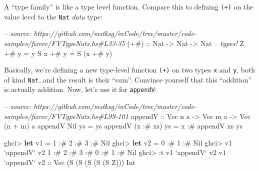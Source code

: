\documentclass[]{article}
\newenvironment{Shaded}{}{}
\newcommand{\KeywordTok}[1]{\textcolor[rgb]{0.00,0.44,0.13}{\textbf{#1}}}
\newcommand{\DataTypeTok}[1]{\textcolor[rgb]{0.56,0.13,0.00}{#1}}
\newcommand{\DecValTok}[1]{\textcolor[rgb]{0.25,0.63,0.44}{#1}}
\newcommand{\CommentTok}[1]{\textcolor[rgb]{0.38,0.63,0.69}{\textit{#1}}}
\newcommand{\OtherTok}[1]{\textcolor[rgb]{0.00,0.44,0.13}{#1}}
\newcommand{\FunctionTok}[1]{\textcolor[rgb]{0.02,0.16,0.49}{#1}}
\newcommand{\NormalTok}[1]{#1}
\begin{document}
A ``type family'' is like a type level function. Compare this to defining
\texttt{(+)} on the value level to the \texttt{Nat} \emph{data} type:

\begin{Shaded}
\begin{Highlighting}[]
\CommentTok{-- source: https://github.com/mstksg/inCode/tree/master/code-samples/fixvec/FVTypeNats.hs#L33-35}
\OtherTok{(+#) ::} \DataTypeTok{Nat} \OtherTok{->} \DataTypeTok{Nat} \OtherTok{->} \DataTypeTok{Nat}       \CommentTok{-- types!}
\DataTypeTok{Z}   \FunctionTok{+#}\NormalTok{ y }\FunctionTok{=}\NormalTok{ y}
\DataTypeTok{S}\NormalTok{ x }\FunctionTok{+#}\NormalTok{ y }\FunctionTok{=} \DataTypeTok{S}\NormalTok{ (x }\FunctionTok{+#}\NormalTok{ y)}
\end{Highlighting}
\end{Shaded}

Basically, we're defining a new type-level function \texttt{(+)} on two types
\texttt{x} and \texttt{y}, both of kind \texttt{Nat}\ldots{}and the result is
their ``sum''. Convince yourself that this ``addition'' is actually addition.
Now, let's use it for \texttt{appendV}:

\begin{Shaded}
\begin{Highlighting}[]
\CommentTok{-- source: https://github.com/mstksg/inCode/tree/master/code-samples/fixvec/FVTypeNats.hs#L99-101}
\OtherTok{appendV ::} \DataTypeTok{Vec}\NormalTok{ n a }\OtherTok{->} \DataTypeTok{Vec}\NormalTok{ m a }\OtherTok{->} \DataTypeTok{Vec}\NormalTok{ (n }\FunctionTok{+}\NormalTok{ m) a}
\NormalTok{appendV }\DataTypeTok{Nil}\NormalTok{       ys }\FunctionTok{=}\NormalTok{ ys}
\NormalTok{appendV (x }\FunctionTok{:#}\NormalTok{ xs) ys }\FunctionTok{=}\NormalTok{ x }\FunctionTok{:#}\NormalTok{ appendV xs ys}
\end{Highlighting}
\end{Shaded}

\begin{Shaded}
\begin{Highlighting}[]
\NormalTok{ghci}\FunctionTok{>} \KeywordTok{let}\NormalTok{ v1 }\FunctionTok{=} \DecValTok{1} \FunctionTok{:#} \DecValTok{2} \FunctionTok{:#} \DecValTok{3} \FunctionTok{:#} \DataTypeTok{Nil}
\NormalTok{ghci}\FunctionTok{>} \KeywordTok{let}\NormalTok{ v2 }\FunctionTok{=} \DecValTok{0} \FunctionTok{:#} \DecValTok{1} \FunctionTok{:#} \DataTypeTok{Nil}
\NormalTok{ghci}\FunctionTok{>}\NormalTok{ v1 }\OtherTok{`appendV`}\NormalTok{ v2}
\DecValTok{1} \FunctionTok{:#} \DecValTok{2} \FunctionTok{:#} \DecValTok{3} \FunctionTok{:#} \DecValTok{0} \FunctionTok{:#} \DecValTok{1} \FunctionTok{:#} \DataTypeTok{Nil}
\NormalTok{ghci}\FunctionTok{>} \FunctionTok{:}\NormalTok{t v1 }\OtherTok{`appendV`}\NormalTok{ v2}
\NormalTok{v1 }\OtherTok{`appendV` v2 ::} \DataTypeTok{Vec}\NormalTok{ (}\DataTypeTok{S}\NormalTok{ (}\DataTypeTok{S}\NormalTok{ (}\DataTypeTok{S}\NormalTok{ (}\DataTypeTok{S}\NormalTok{ (}\DataTypeTok{S} \DataTypeTok{Z}\NormalTok{))) }\DataTypeTok{Int}
\end{Highlighting}
\end{Shaded}
\end{document}
